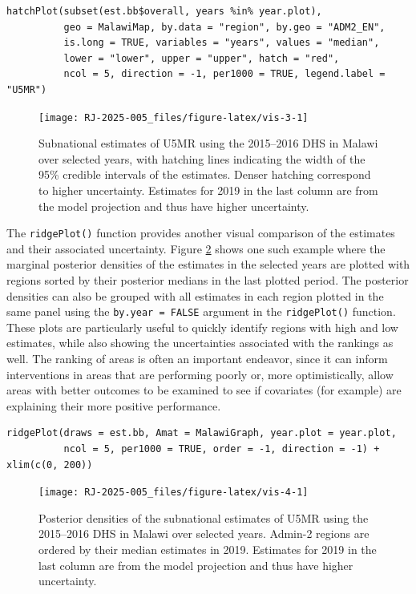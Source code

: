 \begin{verbatim}
hatchPlot(subset(est.bb$overall, years %in% year.plot), 
          geo = MalawiMap, by.data = "region", by.geo = "ADM2_EN", 
          is.long = TRUE, variables = "years", values = "median", 
          lower = "lower", upper = "upper", hatch = "red",
          ncol = 5, direction = -1, per1000 = TRUE, legend.label = "U5MR")
\end{verbatim}

\begin{figure}[!ht]
\texttt{[image: RJ-2025-005\_files/figure-latex/vis-3-1]} \caption{Subnational estimates of U5MR using the 2015--2016 DHS in Malawi over selected years, with hatching lines indicating the width of the 95\% credible intervals of the estimates. Denser hatching correspond to higher uncertainty. Estimates for 2019 in the last column are from the model projection and thus have higher uncertainty.}\label{fig:vis-3}
\end{figure}

The \texttt{ridgePlot()} function provides another visual comparison of the estimates and their associated uncertainty. Figure \ref{fig:vis-4} shows one such example where the marginal posterior densities of the estimates in the selected years are plotted with regions sorted by their posterior medians in the last plotted period. The posterior densities can also be grouped with all estimates in each region plotted in the same panel using the \texttt{by.year\ =\ FALSE} argument in the \texttt{ridgePlot()} function. These plots are particularly useful to quickly identify regions with high and low estimates, while also showing the uncertainties associated with the rankings as well. The ranking of areas is often an important endeavor, since it can inform interventions in areas that are performing poorly or, more optimistically, allow areas with better outcomes to be examined to see if covariates (for example) are explaining their more positive performance.

\begin{verbatim}
ridgePlot(draws = est.bb, Amat = MalawiGraph, year.plot = year.plot,
          ncol = 5, per1000 = TRUE, order = -1, direction = -1) + xlim(c(0, 200))
\end{verbatim}

\begin{figure}[!ht]
\texttt{[image: RJ-2025-005\_files/figure-latex/vis-4-1]} \caption{Posterior densities of the subnational estimates of U5MR using the 2015--2016 DHS in Malawi over selected years. Admin-2 regions are ordered by their median estimates in 2019. Estimates for 2019 in the last column are from the model projection and thus have higher uncertainty.}\label{fig:vis-4}
\end{figure}

